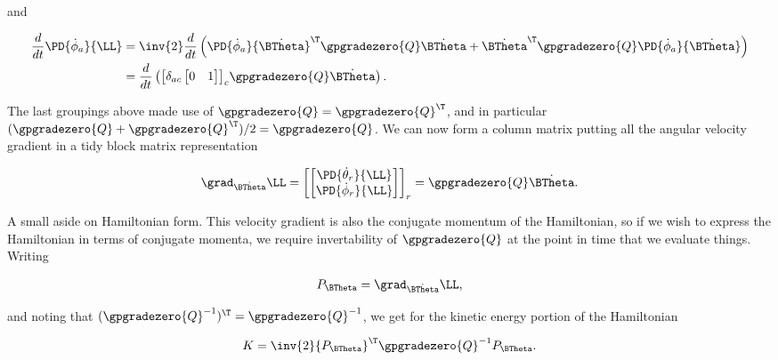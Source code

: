 and

\begin{align*}
\frac{d}{dt} \PD{\dot{\phi}_a}{\LL}
&=
\inv{2} \frac{d}{dt} 
\left(
\PD{\dot{\phi}_a}{\dot{\BTheta}}^\T
\gpgradezero{Q} 
\dot{\BTheta}
+
\dot{\BTheta}^\T
\gpgradezero{Q} 
\PD{\dot{\phi}_a}{\dot{\BTheta}}
\right)  \\
&=
\frac{d}{dt} \left(
{\begin{bmatrix}
\delta_{ac}
\begin{bmatrix}
0 & 1
\end{bmatrix}
\end{bmatrix}}_c
\gpgradezero{Q} 
\dot{\BTheta}
\right).
\end{align*}

The last groupings above made use of $\gpgradezero{Q} = \gpgradezero{Q}^\T$, and in particular $(\gpgradezero{Q} + \gpgradezero{Q}^\T)/2 = \gpgradezero{Q}$.  We can now form a column matrix putting all the angular velocity gradient in a tidy block matrix representation

\begin{align}\label{eqn:sPolarArxiv:boo22}
\grad_{\dot{\BTheta}} \LL = 
{\begin{bmatrix}
\begin{bmatrix}
\PD{\dot{\theta}_r}{\LL} \\
\PD{\dot{\phi}_r}{\LL} \\
\end{bmatrix}
\end{bmatrix}}_r = \gpgradezero{Q} \dot{\BTheta}.
\end{align}

A small aside on Hamiltonian form.  This velocity gradient is also the conjugate momentum of the Hamiltonian, so if we wish to express the Hamiltonian in terms of conjugate momenta, we require invertability of $\gpgradezero{Q}$ at the point in time that we evaluate things.  Writing

\begin{align}\label{eqn:sPolarArxiv:boo30}
P_{\BTheta} = \grad_{\dot{\BTheta}} \LL,
\end{align}

and noting that $(\gpgradezero{Q}^{-1})^\T = \gpgradezero{Q}^{-1}$, we get for the kinetic energy portion of the Hamiltonian 

\begin{align}\label{eqn:sPolarArxiv:boo31}
K = \inv{2} {P_{\BTheta}}^\T \gpgradezero{Q}^{-1} P_{\BTheta}.
\end{align}

